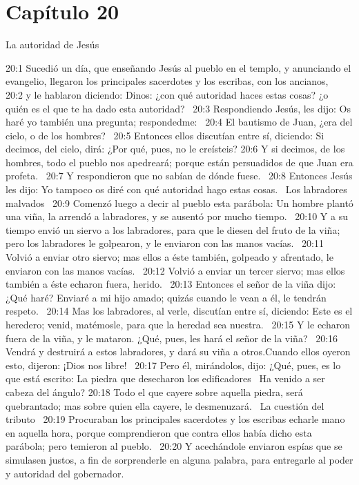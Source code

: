\section*{Capítulo 20}
La autoridad de Jesús   

20:1 Sucedió un día, que enseñando Jesús al pueblo en el templo, y anunciando el evangelio, llegaron los principales sacerdotes y los escribas, con los ancianos,  
20:2 y le hablaron diciendo: Dinos: ¿con qué autoridad haces estas cosas? ¿o quién es el que te ha dado esta autoridad?  
20:3 Respondiendo Jesús, les dijo: Os haré yo también una pregunta; respondedme:  
20:4 El bautismo de Juan, ¿era del cielo, o de los hombres?  
20:5 Entonces ellos discutían entre sí, diciendo: Si decimos, del cielo, dirá: ¿Por qué, pues, no le creísteis? 
20:6 Y si decimos, de los hombres, todo el pueblo nos apedreará; porque están persuadidos de que Juan era profeta.  
20:7 Y respondieron que no sabían de dónde fuese.  
20:8 Entonces Jesús les dijo: Yo tampoco os diré con qué autoridad hago estas cosas.  
Los labradores malvados   
20:9 Comenzó luego a decir al pueblo esta parábola: Un hombre plantó una viña, la arrendó a labradores, y se ausentó por mucho tiempo.  
20:10 Y a su tiempo envió un siervo a los labradores, para que le diesen del fruto de la viña; pero los labradores le golpearon, y le enviaron con las manos vacías.  
20:11 Volvió a enviar otro siervo; mas ellos a éste también, golpeado y afrentado, le enviaron con las manos vacías.  
20:12 Volvió a enviar un tercer siervo; mas ellos también a éste echaron fuera, herido.  
20:13 Entonces el señor de la viña dijo: ¿Qué haré? Enviaré a mi hijo amado; quizás cuando le vean a él, le tendrán respeto.  
20:14 Mas los labradores, al verle, discutían entre sí, diciendo: Este es el heredero; venid, matémosle, para que la heredad sea nuestra.  
20:15 Y le echaron fuera de la viña, y le mataron. ¿Qué, pues, les hará el señor de la viña?  
20:16 Vendrá y destruirá a estos labradores, y dará su viña a otros.Cuando ellos oyeron esto, dijeron: ¡Dios nos libre!  
20:17 Pero él, mirándolos, dijo: ¿Qué, pues, es lo que está escrito: 
La piedra que desecharon los edificadores  
Ha venido a ser cabeza del ángulo? 
20:18 Todo el que cayere sobre aquella piedra, será quebrantado; mas sobre quien ella cayere, le desmenuzará.  
La cuestión del tributo   
20:19 Procuraban los principales sacerdotes y los escribas echarle mano en aquella hora, porque comprendieron que contra ellos había dicho esta parábola; pero temieron al pueblo.  
20:20 Y acechándole enviaron espías que se simulasen justos, a fin de sorprenderle en alguna palabra, para entregarle al poder y autoridad del gobernador.  
